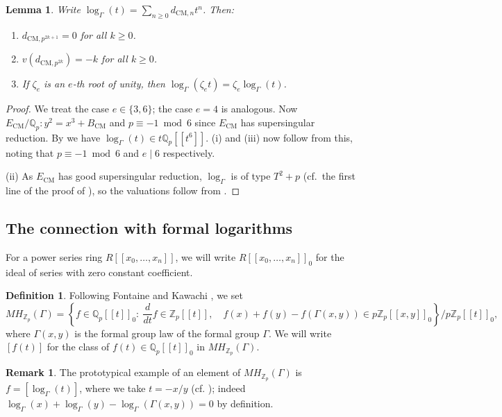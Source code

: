 \documentclass{amsart}
\newcommand{\Qp}{\mathbb{Q}_p}
\newtheorem{lemma}[theorem]{Lemma}
\theoremstyle{definition}
\newtheorem{definition}[theorem]{Definition}
\newtheorem{remark}[theorem]{Remark}
\newcommand{\Z}{\mathbb{Z}}
\newcommand{\Q}{\mathbb{Q}}
\numberwithin{theorem}{section}
\numberwithin{equation}{section}
\begin{document}
\begin{lemma}\label{lemma: odd-killed}
Write $\log_\Gamma(t)=\sum_{n\ge 0} d_{\mathrm{CM},n} t^{n}$. Then:
\begin{enumerate}
\item $d_{\mathrm{CM}, p^{2k+1}}=0$ for all $k \ge 0$.
\item $v(d_{\mathrm{CM},p^{2k}}) = -k$ for all $k \ge 0$.
\item If $\zeta_e$ is an $e$-th root of unity, then $\log_\Gamma(\zeta_e t)=\zeta_e \log_\Gamma(t)$.
\end{enumerate}
\end{lemma}

\begin{proof}
We treat the case $e \in \{3,6\}$; the case $e=4$ is analogous. Now $E_{\mathrm{CM}}/\Qp: y^2=x^3+B_{\mathrm{CM}}$ and $p \equiv -1 \bmod{6}$ since $E_{\mathrm{CM}}$ has supersingular reduction. By  we have $\log_\Gamma(t) \in t\Qp[[t^6]].$ (i) and (iii) now follow from this, noting that $p \equiv -1 \bmod{6}$ and $e \mid 6$ respectively.

(ii)  As $E_{\mathrm{CM}}$ has good supersingular reduction, $\log_\Gamma$ is of type $T^2+p$ (cf.\ the first line of the proof of \cite[Proposition 2.1.1]{Kawachi}), so the valuations follow from \cite[Lemma 2.1.1]{Kawachi}.
\end{proof}


\subsection{The connection with formal logarithms}\label{subsect: connection with formal logs}

For a power series ring $R[[x_0,\ldots,x_n]]$, we will write $R[[x_0,\ldots,x_n]]_0$ for the ideal of series with zero constant coefficient.

\begin{definition}\label{def: MH Zp}
Following Fontaine \cite[p.~166]{Fontaine-p-divisible} and Kawachi \cite[p.~695]{Kawachi}, we set
\[
    MH_{\Z_p}(\Gamma)=\left\{ f \in \Q_p[[t]]_0 : \ \frac{d}{dt}f \in \Z_p[[t]] , \quad f(x)+f(y)-f(\Gamma(x,y))\in p\Z_p[[x,y]]_0\right\} / p\Z_p[[t]]_0,
\]
where $\Gamma(x,y)$ is the formal group law of the formal group $\Gamma$. We will write $[f(t)]$ for the class of $f(t) \in \Q_p[[t]]_0$ in $MH_{\Z_p}(\Gamma)$.
\end{definition}


\begin{remark}\label{rmk: log in MH}
The prototypical example of an element of $MH_{\Z_p}(\Gamma)$ is $f=[\log_{\Gamma}(t)]$, where we take $t=-x/y$ (cf. ); indeed $\log_{\Gamma}(x) + \log_{\Gamma}(y) - \log_{\Gamma}(\Gamma(x,y))=0$ by definition. 
\end{remark}
\end{document}
